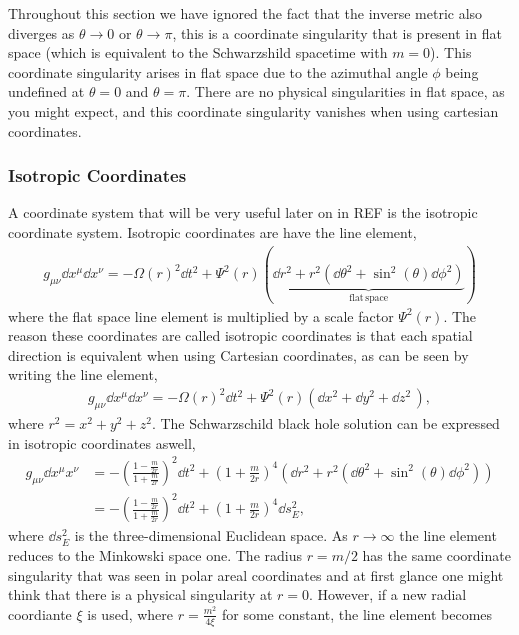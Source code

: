 Throughout this section we have ignored the fact that the inverse metric also diverges as $\theta\rightarrow 0$ or $\theta \rightarrow \pi$, this is a coordinate singularity that is present in flat space (which is equivalent to the Schwarzshild spacetime with $m=0$). This coordinate singularity arises in flat space due to the azimuthal angle $\phi$ being undefined at $\theta=0$ and $\theta=\pi$. There are no physical singularities in flat space, as you might expect, and this coordinate singularity vanishes when using cartesian coordinates.

\subsubsection{Isotropic Coordinates}
A coordinate system that will be very useful later on in REF is the isotropic coordinate system. Isotropic coordinates are have the line element,
\begin{align}
g_{\mu\nu} \dd x^\mu \dd x^\nu = -\Omega(r)^2 \dd t^2 + \Psi^2(r) \left( \underbrace{\dd r^2 + r^2 \left( \dd \theta^2 + \sin^2(\theta) \dd \phi^2 \right)}_{\mathrm{flat}\,\mathrm{space}}\right)
\end{align}
where the flat space line element is multiplied by a scale factor $\Psi^2(r)$. The reason these coordinates are called isotropic coordinates is that each spatial direction is equivalent when using Cartesian coordinates, as can be seen by writing the line element,
\begin{align}
g_{\mu\nu} \dd x^\mu \dd x^\nu = -\Omega(r)^2 \dd t^2 + \Psi^2(r) \left( {\dd x^2 + \dd y^2 + \dd z^2 }\,\right),
\end{align}
where $r^2 = x^2 + y^2 + z^2$. The Schwarzschild black hole solution can be expressed in isotropic coordinates aswell,
\begin{align} \label{intro:eq:iso_bh}
g_{\mu\nu} \dd x^\mu x^\nu &=-\left(\frac{1-\frac{m}{2r}}{1+\frac{m}{2r}} \right)^2 \dd t^2 + \left(1+\frac{m}{2r} \right)^4\left( \dd r^2 + r^2 \left( \dd \theta^2 + \sin^2(\theta) \dd \phi^2 \right)\right) \\
&= -\left(\frac{1-\frac{m}{2r}}{1+\frac{m}{2r}} \right)^2 \dd t^2 + \left(1+\frac{m}{2r} \right)^4 \dd s_{E}^2,
\end{align}
where $\dd s_{E}^2$ is the three-dimensional Euclidean space. As $r \rightarrow \infty$ the line element reduces to the Minkowski space one. The radius $r= m/2$ has the same coordinate singularity that was seen in polar areal coordinates and at first glance one might think that there is a physical singularity at $r=0$. However, if a new radial coordiante $\xi$ is used, where $r = \frac{m^2}{4\xi}$ for some constant, the line element becomes 
